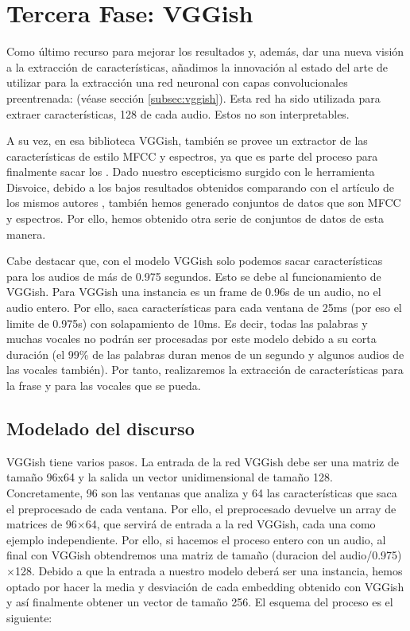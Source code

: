 \section{Tercera Fase: VGGish} \label{sec:fase3}
Como último recurso para mejorar los resultados y, además, dar una nueva visión a la extracción de características, añadimos la innovación al estado del arte de utilizar para la extracción una red neuronal con capas convolucionales preentrenada:  (véase sección \ref{subsec:vggish}). Esta red ha sido utilizada para extraer características, 128  de cada audio. Estos  no son interpretables. 

A su vez, en esa biblioteca VGGish, también se provee un extractor de las características de estilo MFCC y espectros, ya que es parte del proceso para finalmente sacar los . Dado nuestro escepticismo surgido con le herramienta Disvoice, debido a los bajos resultados obtenidos comparando con el artículo de los mismos autores \cite{Orz2016}, también hemos generado conjuntos de datos que son MFCC y espectros. Por ello, hemos obtenido otra serie de conjuntos de datos de esta manera.

Cabe destacar que, con el modelo VGGish solo podemos sacar características para los audios de más de 0.975 segundos. Esto se debe al funcionamiento de VGGish. Para VGGish una instancia es un frame de 0.96s de un audio, no el audio entero. Por ello, saca características para cada ventana de 25ms (por eso el limite de 0.975s) con solapamiento de 10ms. Es decir, todas las palabras y muchas vocales no podrán ser procesadas por este modelo debido a su corta duración (el 99\% de las palabras duran menos de un segundo y algunos audios de las vocales también). Por tanto, realizaremos la extracción de características para la frase y para las vocales que se pueda.


\subsection{Modelado del discurso}
VGGish tiene varios pasos. La entrada de la red VGGish debe ser una matriz de tamaño 96x64 y la salida un vector unidimensional de tamaño 128. Concretamente, 96 son las ventanas que analiza y 64 las características que saca el preprocesado de cada ventana. Por ello, el preprocesado devuelve un array de matrices de 96$\times$64, que servirá de entrada a la red VGGish, cada una como ejemplo independiente. Por ello, si hacemos el proceso entero con un audio, al final con VGGish obtendremos una matriz de tamaño (duracion del audio/0.975)$\times$128. Debido a que la entrada a nuestro modelo deberá ser una instancia, hemos optado por hacer la media y desviación de cada embedding obtenido con VGGish y así finalmente obtener un vector de tamaño 256. El esquema del proceso es el siguiente:

